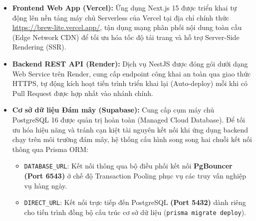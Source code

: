 \documentclass[12pt,a4paper,oneside]{report}
\begin{document}
\begin{itemize}
    \item \textbf{Frontend Web App (Vercel):} Ứng dụng Next.js 15 được triển khai tự động lên nền tảng máy chủ Serverless của Vercel tại địa chỉ chính thức \url{https://brew-lite.vercel.app/}, tận dụng mạng phân phối nội dung toàn cầu (Edge Network CDN) để tối ưu hóa tốc độ tải trang và hỗ trợ Server-Side Rendering (SSR).
    \item \textbf{Backend REST API (Render):} Dịch vụ NestJS được đóng gói dưới dạng Web Service trên Render, cung cấp endpoint công khai an toàn qua giao thức HTTPS, tự động kích hoạt tiến trình triển khai lại (Auto-deploy) mỗi khi có Pull Request được hợp nhất vào nhánh chính.
    \item \textbf{Cơ sở dữ liệu Đám mây (Supabase):} Cung cấp cụm máy chủ PostgreSQL 16 được quản trị hoàn toàn (Managed Cloud Database). Để tối ưu hóa hiệu năng và tránh cạn kiệt tài nguyên kết nối khi ứng dụng backend chạy trên môi trường đám mây, hệ thống cấu hình song song hai chuỗi kết nối thông qua Prisma ORM:
    \begin{itemize}
        \item \texttt{DATABASE\_URL}: Kết nối thông qua bộ điều phối kết nối \textbf{PgBouncer (Port 6543)} ở chế độ Transaction Pooling phục vụ các truy vấn nghiệp vụ hàng ngày.
        \item \texttt{DIRECT\_URL}: Kết nối trực tiếp đến PostgreSQL \textbf{(Port 5432)} dành riêng cho tiến trình đồng bộ cấu trúc cơ sở dữ liệu (\texttt{prisma migrate deploy}).
    \end{itemize}
\end{itemize}
\end{document}
